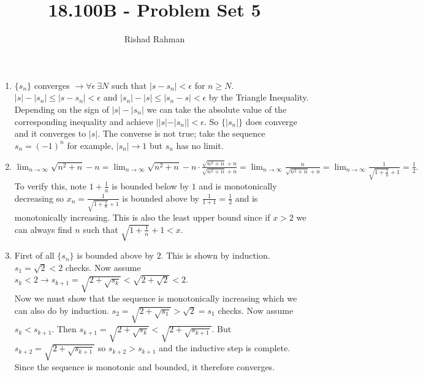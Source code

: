 \documentclass{article}
\begin{document}
\title{18.100B - Problem Set 5}
\author{Rishad Rahman}
\date{}
\maketitle
\begin{enumerate}
\item $\{s_n\}$ converges $\rightarrow \forall \epsilon \ \exists N$ such that $|s-s_n| < \epsilon$ for $n\geq N$. $|s|-|s_n| \leq |s-s_n| < \epsilon$ and $|s_n|-|s| \leq |s_n-s| < \epsilon$ by the Triangle Inequality. Depending on the sign of $|s|-|s_n|$ we can take the absolute value of the corresponding inequality and achieve $||s|-|s_n|| < \epsilon$. So $\{|s_n|\}$ does converge and it converges to $|s|$. The converse is not true; take the sequence $s_n=(-1)^n$ for example, $|s_n| \rightarrow 1$ but $s_n$ has no limit. 
\\ 
\item $\displaystyle\lim_{n\rightarrow\infty} \sqrt{n^2+n}-n=\displaystyle\lim_{n\rightarrow\infty}\sqrt{n^2+n}-n\cdot\frac{\sqrt{n^2+n}+n}{\sqrt{n^2+n}+n}=\displaystyle\lim_{n\rightarrow\infty}\frac{n}{\sqrt{n^2+n}+n}=\displaystyle\lim_{n\rightarrow\infty}\frac{1}{\sqrt{1+\frac{1}{n}}+1}=\frac{1}{2}.$ To verify this, note $1+\frac{1}{n}$ is bounded below by $1$ and is monotonically decreasing so $x_n=\frac{1}{\sqrt{1+\frac{1}{n}}+1}$ is bounded above by $\frac{1}{1+1}=\frac{1}{2}$ and is monotonically increasing. This is also the least upper bound since if $x>2$ we can always find $n$ such that $\sqrt{1+\frac{1}{n}}+1<x$.
\\
\item First of all $\{s_n\}$ is bounded above by $2$. This is shown by induction. $s_1=\sqrt{2} < 2$ checks. Now assume $s_k < 2\rightarrow s_{k+1}=\sqrt{2+\sqrt{s_k}} < \sqrt{2+\sqrt{2}} < 2$.
\\
Now we must show that the sequence is monotonically increasing which we can also do by induction. $s_2=\sqrt{2+\sqrt{s_1}} > \sqrt{2}=s_1$ checks. Now assume $s_k < s_{k+1}$. Then $s_{k+1}=\sqrt{2+\sqrt{s_{k}}}<\sqrt{2+\sqrt{s_{k+1}}}$. But $s_{k+2} = \sqrt{2+\sqrt{s_{k+1}}}$ so $s_{k+2} > s_{k+1}$ and the inductive step is complete.
\\Since the sequence is monotonic and bounded, it therefore converges.
\\

\end{enumerate}
\end{document}
